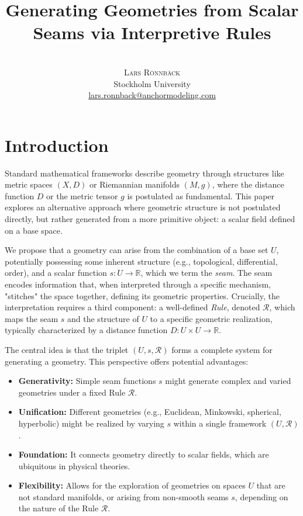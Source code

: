 \documentclass[twoside,twocolumn]{article}
\title{\vspace{5mm}\fontsize{24pt}{10pt}\selectfont\textbf{Generating Geometries from Scalar Seams via Interpretive Rules}} %
\author{%
\\[2mm] %
\textsc{Lars Rönnbäck}%
\\[1ex] %
\normalsize Stockholm University \\ %
\normalsize \href{mailto:lars.ronnback@anchormodeling.com}{lars.ronnback@anchormodeling.com} %
\\[1ex] %
}
\date{}
\begin{document}
\maketitle
\thispagestyle{fancy}


\section{Introduction}

Standard mathematical frameworks describe geometry through structures like metric spaces $(X, D)$ or Riemannian manifolds $(M, g)$, where the distance function $D$ or the metric tensor $g$ is postulated as fundamental. This paper explores an alternative approach where geometric structure is not postulated directly, but rather generated from a more primitive object: a scalar field defined on a base space.

We propose that a geometry can arise from the combination of a base set $U$, potentially possessing some inherent structure (e.g., topological, differential, order), and a scalar function $s: U \to \mathbb{R}$, which we term the \emph{seam}. The seam encodes information that, when interpreted through a specific mechanism, "stitches" the space together, defining its geometric properties. Crucially, the interpretation requires a third component: a well-defined \emph{Rule}, denoted $\mathcal{R}$, which maps the seam $s$ and the structure of $U$ to a specific geometric realization, typically characterized by a distance function $D: U \times U \to \mathbb{R}$.

The central idea is that the triplet $(U, s, \mathcal{R})$ forms a complete system for generating a geometry. This perspective offers potential advantages:
\begin{itemize}
    \item \textbf{Generativity:} Simple seam functions $s$ might generate complex and varied geometries under a fixed Rule $\mathcal{R}$.
    \item \textbf{Unification:} Different geometries (e.g., Euclidean, Minkowski, spherical, hyperbolic) might be realized by varying $s$ within a single framework $(U, \mathcal{R})$.
    \item \textbf{Foundation:} It connects geometry directly to scalar fields, which are ubiquitous in physical theories. %
    \item \textbf{Flexibility:} Allows for the exploration of geometries on spaces $U$ that are not standard manifolds, or arising from non-smooth seams $s$, depending on the nature of the Rule $\mathcal{R}$.
\end{itemize}
\end{document}
